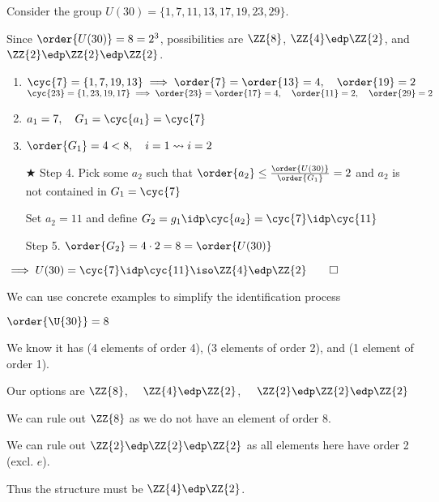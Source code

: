 \begin{example}
Consider the group \(U(30)=\{1,7,11,13,17,19,23,29\}\).

Since \(\order{U(30)}=8=2^3\), possibilities are \(\ZZ{8}\), \(\ZZ{4}\edp\ZZ{2}\), and \(\ZZ{2}\edp\ZZ{2}\edp\ZZ{2}\).

\begin{enumerate}[label=Step \arabic*., left=0pt, labelsep=1em]
\item \(\cyc{7}  = \{1,7,19,13\}  \implies \order{7}=\order{13}=4,\quad \order{19}=2\) \\
\(\cyc{23} = \{1,23,19,17\} \implies \order{23}=\order{17}=4,\quad \order{11}=2,\quad \order{29}=2\)
\item \(a_1 = 7 ,\quad G_1=\cyc{a_1}=\cyc{7}\)
\item \(\order{G_1}=4 < 8, \quad i=1\rightsquigarrow i=2\)
\item[\textcircled{\(\bigstar\)}  Step 4.] Pick some \(a_2\) such that \(\order{a_2} \leq \frac{\order{U(30)}}{\order{G_1}} = 2\) and \(a_2\) is not contained in \(G_1 = \cyc{7}\)

Set \(a_2 = 11\) and define \(G_2 = g_1 \idp \cyc{a_2} = \cyc{7}\idp\cyc{11}\)
\item[Step 5.] \(\order{G_2} = 4\cdot 2 = 8 = \order{U(30)}\)
\end{enumerate}
\(\implies U(30) =  \cyc{7}\idp\cyc{11} \iso \ZZ{4} \edp \ZZ{2} \qed\)
\end{example}

We can use concrete examples to simplify the identification process

\begin{example} \(\order{\U{30}} = 8\)

We know it has (4 elements of order 4), (3 elements of order 2), and (1 element of order 1).

Our options are \(\ZZ{8}\), \(\quad\ZZ{4}\edp\ZZ{2}\), \(\quad\ZZ{2}\edp\ZZ{2}\edp\ZZ{2}\)

We can rule out \(\ZZ{8}\) as we do not have an element of order 8.

We can rule out \(\ZZ{2}\edp\ZZ{2}\edp\ZZ{2}\) as all elements here have order 2 (excl. \(e\)).

Thus the structure must be \(\ZZ{4}\edp\ZZ{2}\).
\end{example}

